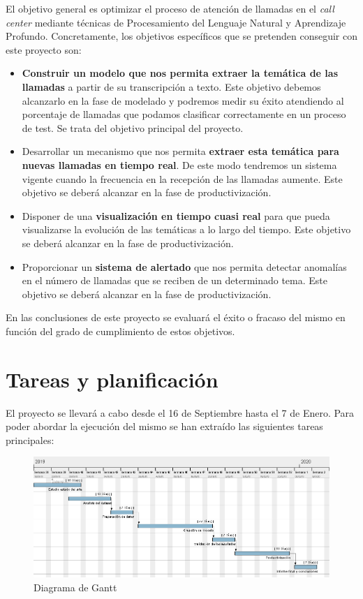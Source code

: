 El objetivo general es optimizar el proceso de atención de llamadas en el \textit{call center} mediante técnicas de Procesamiento del Lenguaje Natural y Aprendizaje Profundo. Concretamente, los objetivos específicos que se pretenden conseguir con este proyecto son: 

\begin{itemize}
	\item \textbf{Construir un modelo que nos permita extraer la temática de las llamadas} a partir de su transcripción a texto. Este objetivo debemos alcanzarlo en la fase de modelado y podremos medir su éxito atendiendo al porcentaje de llamadas que podamos clasificar correctamente en un proceso de test. Se trata del objetivo principal del proyecto.
	\item Desarrollar un mecanismo que nos permita \textbf{extraer esta temática para nuevas llamadas en tiempo real}. De este modo tendremos un sistema vigente cuando la frecuencia en la recepción de las llamadas aumente. Este objetivo se deberá alcanzar en la fase de productivización. 
	\item Disponer de una\textbf{ visualización en tiempo cuasi real} para que pueda visualizarse la evolución de las temáticas a lo largo del tiempo. Este objetivo se deberá alcanzar en la fase de productivización. 
	\item Proporcionar un \textbf{sistema de alertado} que nos permita detectar anomalías en el número de llamadas que se reciben de un determinado tema. Este objetivo se deberá alcanzar en la fase de productivización.
\end{itemize}

En las conclusiones de este proyecto se evaluará el éxito o fracaso del mismo en función del grado de cumplimiento de estos objetivos.

\section{Tareas y planificación}
\label{section:intro:planificacion}
El proyecto se llevará a cabo desde el 16 de Septiembre hasta el 7 de Enero. Para poder abordar la ejecución del  mismo se han extraído las siguientes tareas principales: 


\begin{figure}[!ht]
	\centering
	\includegraphics[width=\textwidth]{images/intro/gantt}
	\caption{Diagrama de Gantt}
	\label{fig:gantt}
\end{figure}


